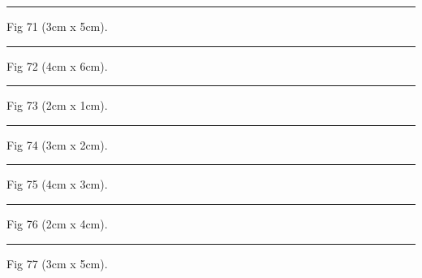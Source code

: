\documentclass[a4paper,11pt]{article}
\begin{document}
\begin{swarmwrap}%
  \begin{minipage}[t]{3cm}
    \centering
    \rule{\linewidth}{5cm}
    {\footnotesize Fig 71 (3cm x 5cm).}
  \end{minipage}%
\end{swarmwrap}%
\swarmwrapnext
\lipsum[71]%

\begin{swarmwrap}%
  \begin{minipage}[t]{4cm}
    \centering
    \rule{\linewidth}{6cm}
    {\footnotesize Fig 72 (4cm x 6cm).}
  \end{minipage}%
\end{swarmwrap}%
\swarmwrapnext
\lipsum[72]%

\begin{swarmwrap}%
  \begin{minipage}[t]{2cm}
    \centering
    \rule{\linewidth}{1cm}
    {\footnotesize Fig 73 (2cm x 1cm).}
  \end{minipage}%
\end{swarmwrap}%
\swarmwrapnext
\lipsum[73]%

\begin{swarmwrap}%
  \begin{minipage}[t]{3cm}
    \centering
    \rule{\linewidth}{2cm}
    {\footnotesize Fig 74 (3cm x 2cm).}
  \end{minipage}%
\end{swarmwrap}%
\swarmwrapnext
\lipsum[74]%

\begin{swarmwrap}%
  \begin{minipage}[t]{4cm}
    \centering
    \rule{\linewidth}{3cm}
    {\footnotesize Fig 75 (4cm x 3cm).}
  \end{minipage}%
\end{swarmwrap}%
\swarmwrapnext
\lipsum[75]%

\begin{swarmwrap}%
  \begin{minipage}[t]{2cm}
    \centering
    \rule{\linewidth}{4cm}
    {\footnotesize Fig 76 (2cm x 4cm).}
  \end{minipage}%
\end{swarmwrap}%
\swarmwrapnext
\lipsum[76]%

\begin{swarmwrap}%
  \begin{minipage}[t]{3cm}
    \centering
    \rule{\linewidth}{5cm}
    {\footnotesize Fig 77 (3cm x 5cm).}
  \end{minipage}%
\end{swarmwrap}%
\swarmwrapnext
\lipsum[77]%
\end{document}
